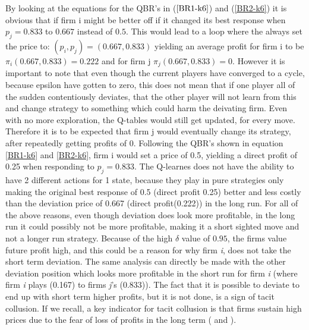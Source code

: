 \documentclass{article}
\begin{document}
\newline
By looking at the equations for the QBR's in ($\ref{BR1-k6}$) and (\ref{BR2-k6}) it is obvious that if firm i might be better off if it  changed its best response when $p_j = 0.833$ to $0.667$ instead of $0.5$. This would lead to a loop where the always set the price to: $(p_i,p_j) =(0.667,0.833)$ yielding an average profit for firm i to be $\pi_i (0.667,0.833) = 0.222$ and for firm j $\pi_j (0.667,0.833) = 0$.
\newline
However it is important to note that even though the current players have converged to a cycle, because epsilon have gotten to zero, this does not mean that if one player all of the sudden contentiously deviates, that the other player will not learn from this and change strategy to something which could harm the deivating firm. Even with no more exploration, the Q-tables would still get updated, for every move. Therefore it is to be expected that firm j would eventually change its strategy, after repeatedly getting profits of 0.
\newline 
Following the QBR's shown in equation \ref{BR1-k6} and \ref{BR2-k6}, firm i would set a price of 0.5, yielding a direct profit of 0.25 when responding to $p_j=0.833$. 
The Q-learnes does not have the ability to have 2 different actions for 1 state, because they play in pure strategies only making the original best response of 0.5 (direct profit 0.25) better and less costly than the deviation price of 0.667 (direct profit(0.222)) in the long run. 
\newline
For all of the above reasons, even though deviation does look more profitable, in the long run it could possibly not be more profitable, making it a short sighted move and not a longer run strategy. 
Because of the high $\delta$ value of $0.95$, the firms value future profit high, and this could be a reason for why firm \textit{i}, does not take the short term deviation.
\newline
The same analysis can directly be made with the other deviation position which looks more profitable in the short run for firm \textit{i} (where firm \textit{i} plays (0.167) to firms \textit{j}'s (0.833)). 
\newline
The fact that it is possible to deviate to end up with short term higher profits, but it is not done, is a sign of tacit collusion. If we recall, a key indicator for tacit collusion is that firms sustain high prices due to the fear of loss of profits in the long term (\cite{Klein2021} and \cite{Calvano}).
\end{document}
